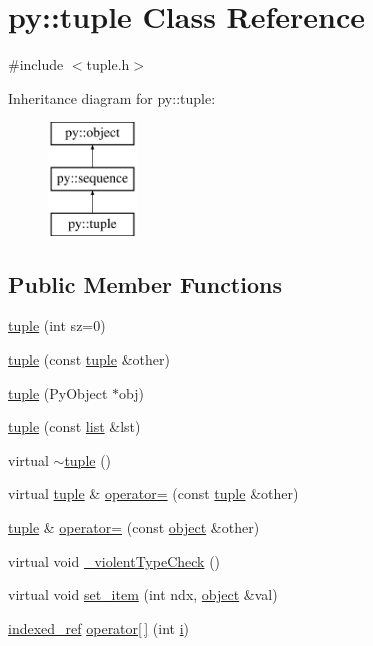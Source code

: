 \hypertarget{classpy_1_1tuple}{}\section{py\+:\+:tuple Class Reference}
\label{classpy_1_1tuple}


{\ttfamily \#include $<$tuple.\+h$>$}

Inheritance diagram for py\+:\+:tuple\+:\begin{figure}[H]
\begin{center}
\leavevmode
\includegraphics[height=3.000000cm]{classpy_1_1tuple}
\end{center}
\end{figure}
\subsection*{Public Member Functions}
\begin{DoxyCompactItemize}
\item 
\hyperlink{classpy_1_1tuple_a832317ae3129ad6bb5b76dda134d8802}{tuple} (int sz=0)
\item 
\hyperlink{classpy_1_1tuple_a12aa07b3d3f45cac6206f243c970a83e}{tuple} (const \hyperlink{classpy_1_1tuple}{tuple} \&other)
\item 
\hyperlink{classpy_1_1tuple_a280e750aa5ca83157fdc6e2c3e25b0a0}{tuple} (Py\+Object $\ast$obj)
\item 
\hyperlink{classpy_1_1tuple_a1936fd03fa418eee7765ae48896dc35e}{tuple} (const \hyperlink{classpy_1_1list}{list} \&lst)
\item 
virtual \hyperlink{classpy_1_1tuple_a6e54f8dd8babbb093c14640a3402f263}{$\sim$tuple} ()
\item 
virtual \hyperlink{classpy_1_1tuple}{tuple} \& \hyperlink{classpy_1_1tuple_ae69c5d4691a22d14bfc184fc6c44b869}{operator=} (const \hyperlink{classpy_1_1tuple}{tuple} \&other)
\item 
\hyperlink{classpy_1_1tuple}{tuple} \& \hyperlink{classpy_1_1tuple_adb9bf511d30586e64900f081c0e89515}{operator=} (const \hyperlink{classpy_1_1object}{object} \&other)
\item 
virtual void \hyperlink{classpy_1_1tuple_add30e237f5b02f038822795c4d04a776}{\+\_\+violent\+Type\+Check} ()
\item 
virtual void \hyperlink{classpy_1_1tuple_a8bf17cffb8432d0157914c4a1db4e865}{set\+\_\+item} (int ndx, \hyperlink{classpy_1_1object}{object} \&val)
\item 
\hyperlink{classpy_1_1indexed__ref}{indexed\+\_\+ref} \hyperlink{classpy_1_1tuple_afebd329f8210e392f3139e9e2a0b3c92}{operator\mbox{[}$\,$\mbox{]}} (int \hyperlink{indexexpr_8h_aabd77643995707c185e95c8cb2782c81}{i})
\end{DoxyCompactItemize}
